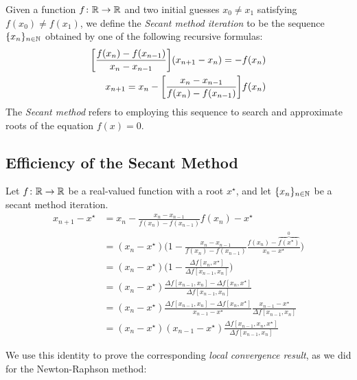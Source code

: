\begin{definition}\label{def:SecantMethod}
Given a function $f \colon \mathbb{R} \to \mathbb{R}$ and two initial guesses $x_0 \neq x_1$ satisfying $f(x_0) \neq f(x_1)$, we define the \emph{Secant method iteration} to be the sequence $\{ x_n \}_{n \in \mathbb{N}}$ obtained by one of the following recursive formulas:
\begin{equation}\label{equation:SecantMethod}\index{Secant method!iteration}
\begin{split}
\bigg[\frac{f(x_n) - f(x_{n-1})}{x_n - x_{n-1}}\bigg] (x_{n+1} - x_n) = - f(x_n) \\
x_{n+1} = x_n - \bigg[ \frac{x_n - x_{n-1}}{f(x_n) - f(x_{n-1})} \bigg] f(x_n)
\end{split}
\end{equation}
The \emph{Secant method} refers to employing this sequence to search and approximate roots of the equation $f(x)=0$.
\end{definition}

\subsection{Efficiency of the Secant Method}
Let $f \colon \mathbb{R} \to \mathbb{R}$ be a real-valued function with a root $x^\star$, and let $\{ x_n \}_{n \in \mathbb{N}}$ be a secant method iteration.  
\begin{align*}
x_{n+1} - x^\star &= x_n - \frac{x_n - x_{n-1}}{f(x_n) - f(x_{n-1})} f(x_n) - x^\star \\
&= (x_n - x^\star) \bigg( 1 - \frac{x_n - x_{n-1}}{f(x_n) - f(x_{n-1})}  \frac{f(x_n) - \overbrace{f(x^\star)}^0}{x_n - x^\star} \bigg) \\
&= (x_n - x^\star) \bigg(  1 - \frac{\Delta f [x_n, x^\star]}{\Delta f [x_{n-1}, x_n]} \bigg) \\
&= (x_n - x^\star) \frac{\Delta f [x_{n-1}, x_n] - \Delta f [x_n, x^\star]}{\Delta f [x_{n-1}, x_n]} \\
&= (x_n - x^\star) \frac{\Delta f [x_{n-1}, x_n] - \Delta f [x_n, x^\star]}{x_{n-1}-x^\star} \frac{x_{n-1}-x^\star}{\Delta f [x_{n-1}, x_n]} \\
&= (x_n - x^\star) (x_{n-1} - x^\star) \frac{\Delta f [x_{n-1}, x_n, x^\star]}{\Delta f [x_{n-1}, x_n]}
\end{align*}

We use this identity to prove the corresponding \emph{local convergence result}, as we did for the Newton-Raphson method:


